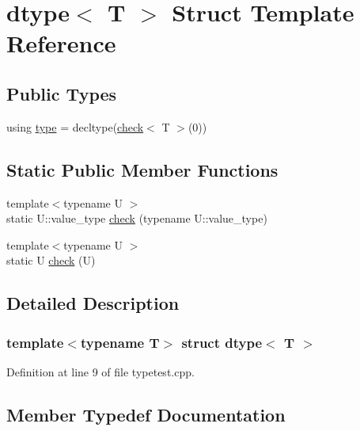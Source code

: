 \hypertarget{structdtype}{}\section{dtype$<$ T $>$ Struct Template Reference}
\label{structdtype}
\subsection*{Public Types}
\begin{DoxyCompactItemize}
\item 
using \mbox{\hyperlink{structdtype_a2c7a9959a8b61a98cc065f03eaa79e89}{type}} = decltype(\mbox{\hyperlink{structdtype_a70fa7f25bb22166e7788e045e62f6a64}{check}}$<$ T $>$(0))
\end{DoxyCompactItemize}
\subsection*{Static Public Member Functions}
\begin{DoxyCompactItemize}
\item 
{\footnotesize template$<$typename U $>$ }\\static U\+::value\+\_\+type \mbox{\hyperlink{structdtype_a70fa7f25bb22166e7788e045e62f6a64}{check}} (typename U\+::value\+\_\+type)
\item 
{\footnotesize template$<$typename U $>$ }\\static U \mbox{\hyperlink{structdtype_a01282018f55ad532f28b1605af093999}{check}} (U)
\end{DoxyCompactItemize}


\subsection{Detailed Description}
\subsubsection*{template$<$typename T$>$\newline
struct dtype$<$ T $>$}



Definition at line 9 of file typetest.\+cpp.



\subsection{Member Typedef Documentation}
\mbox{\label{structdtype_a2c7a9959a8b61a98cc065f03eaa79e89}} 
